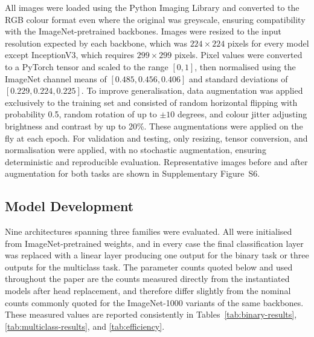 \documentclass[final,3p,times,number]{elsarticle}
\begin{document}
All images were loaded using the Python Imaging Library and converted to the RGB colour format even where the original was greyscale, ensuring compatibility with the ImageNet-pretrained backbones. Images were resized to the input resolution expected by each backbone, which was $224\times 224$ pixels for every model except InceptionV3, which requires $299\times 299$ pixels. Pixel values were converted to a PyTorch tensor and scaled to the range $[0,1]$, then normalised using the ImageNet channel means of $[0.485, 0.456, 0.406]$ and standard deviations of $[0.229, 0.224, 0.225]$. To improve generalisation, data augmentation was applied exclusively to the training set and consisted of random horizontal flipping with probability 0.5, random rotation of up to $\pm 10$ degrees, and colour jitter adjusting brightness and contrast by up to 20\%. These augmentations were applied on the fly at each epoch. For validation and testing, only resizing, tensor conversion, and normalisation were applied, with no stochastic augmentation, ensuring deterministic and reproducible evaluation. Representative images before and after augmentation for both tasks are shown in Supplementary Figure~S6.

\subsection{Model Development}
\label{sec:models}

Nine architectures spanning three families were evaluated. All were initialised from ImageNet-pretrained weights, and in every case the final classification layer was replaced with a linear layer producing one output for the binary task or three outputs for the multiclass task. The parameter counts quoted below and used throughout the paper are the counts measured directly from the instantiated models after head replacement, and therefore differ slightly from the nominal counts commonly quoted for the ImageNet-1000 variants of the same backbones. These measured values are reported consistently in Tables~\ref{tab:binary-results}, \ref{tab:multiclass-results}, and \ref{tab:efficiency}.
\end{document}
